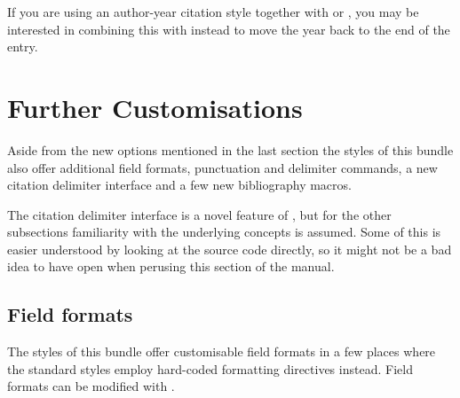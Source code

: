 \documentclass[DIV=9]{scrartcl}
\makeatletter
\newcommand*{\exampleprintbib}[1]{%
  \nocite{#1}%
  \let\extblxdoc@examplebib@list\empty
  \def\do##1{\listeadd\extblxdoc@examplebib@list{\detokenize{##1}}}%
  \docsvlist{#1}%
  \printbibliography[check=examplebib, heading=none]}
\makeatother
\begin{document}
\begin{optionlist}
If you are using an author-year citation style together with
 or , you may be interested in
combining this with  instead to move the year
back to the end of the entry.
\makeatletter
\begin{bibexample}[enhanced, title={\kvopt{introcite}{label} with
  \kvopt{style}{ext-authoryear} and \kvopt{bibstyle}{ext-authortitle}}]
\setlength{\introcitewidth}{0pt}
\setlength{\introcitesep}{\bibhang}
\bbx@opt@mergedate@false
{}
\exampleprintbib{sigfridsson,geer}
\end{bibexample}
\makeatother
\end{optionlist}

\clearpage
\section{Further Customisations}\label{sec:opt:cust}
Aside from the new options mentioned in the last section the styles of this
bundle also offer additional field formats, punctuation and delimiter commands,
a new citation delimiter interface and a few new bibliography macros.

The citation delimiter interface is a novel feature of ,
but for the other subsections familiarity with the underlying 
concepts is assumed.
Some of this is easier understood by looking at the source code directly,
so it might not be a bad idea to have  open when
perusing this section of the manual.

\subsection{Field formats}\label{sec:opt:field}
The styles of this bundle offer customisable field formats
in a few places where the standard styles employ hard-coded formatting
directives instead.
Field formats can be modified with .
\end{document}
